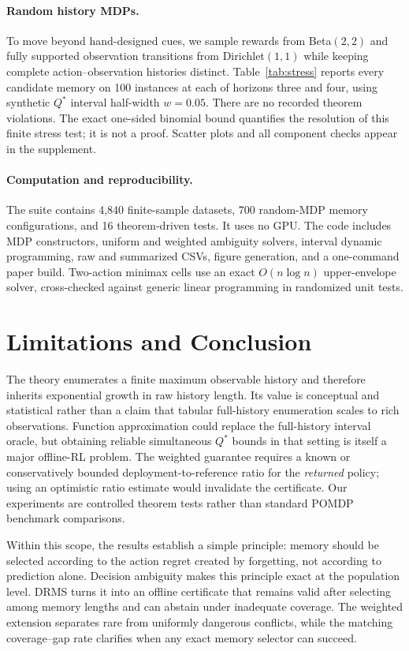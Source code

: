 \documentclass[letterpaper]{article} %
\theoremstyle{remark}
\newcommand{\DRMS}{\textnormal{\textsc{DRMS}}}
\begin{document}
\paragraph{Random history MDPs.}
To move beyond hand-designed cues, we sample rewards from Beta$(2,2)$ and
fully supported observation transitions from Dirichlet$(1,1)$ while keeping
complete action--observation histories distinct. Table~\ref{tab:stress}
reports every candidate memory on 100 instances at each of horizons three and
four, using synthetic $Q^*$ interval half-width $w=0.05$. There are no
recorded theorem violations. The exact one-sided binomial bound quantifies the
resolution of this finite stress test; it is not a proof. Scatter plots and
all component checks appear in the supplement.

\paragraph{Computation and reproducibility.}
The suite contains 4,840 finite-sample datasets, 700 random-MDP memory
configurations, and 16 theorem-driven tests. It uses no GPU. The code includes
MDP constructors, uniform and weighted ambiguity solvers, interval dynamic
programming, raw and summarized CSVs, figure generation, and a one-command
paper build. Two-action minimax cells use an exact $O(n\log n)$ upper-envelope
solver, cross-checked against generic linear programming in randomized unit
tests.

\section{Limitations and Conclusion}

The theory enumerates a finite maximum observable history and therefore
inherits exponential growth in raw history length. Its value is conceptual and
statistical rather than a claim that tabular full-history enumeration scales
to rich observations. Function approximation could replace the full-history
interval oracle, but obtaining reliable simultaneous $Q^*$ bounds in that
setting is itself a major offline-RL problem. The weighted guarantee requires
a known or conservatively bounded deployment-to-reference ratio for the
\emph{returned} policy; using an optimistic ratio estimate would invalidate
the certificate. Our experiments are controlled theorem tests rather than
standard POMDP benchmark comparisons.

Within this scope, the results establish a simple principle: memory should be
selected according to the action regret created by forgetting, not according
to prediction alone. Decision ambiguity makes this principle exact at the
population level. \DRMS{} turns it into an offline certificate that remains
valid after selecting among memory lengths and can abstain under inadequate
coverage. The weighted extension separates rare from uniformly dangerous
conflicts, while the matching coverage--gap rate clarifies when any exact
memory selector can succeed.

\FloatBarrier



\end{document}
